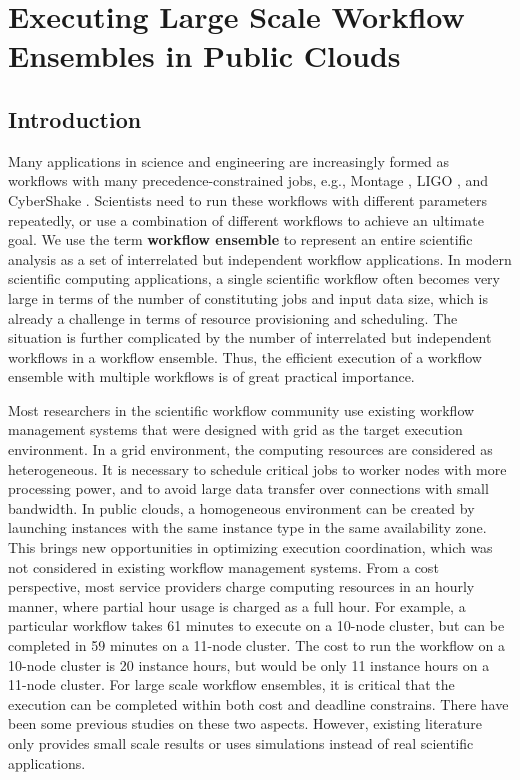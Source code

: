 \chapter{Executing Large Scale Workflow Ensembles in Public Clouds}
\label{chapter:dewe_v2}

\section{Introduction}
\label{sec:intro}

Many applications in science and engineering are increasingly formed as workflows with many precedence-constrained jobs, e.g., Montage \cite{montage, web:montage}, LIGO \cite{ligo}, and CyberShake \cite{cybershake}. Scientists need to run these workflows with different parameters repeatedly, or use a combination of different workflows to achieve an ultimate goal. We use the term \textbf{workflow ensemble} to represent an entire scientific analysis as a set of interrelated but independent workflow applications. In modern scientific computing applications, a single scientific workflow often becomes very large in terms of the number of constituting jobs and input data size, which is already a challenge in terms of resource provisioning and scheduling. The situation is further complicated by the number of interrelated but independent workflows in a workflow ensemble. Thus, the efficient execution of a workflow ensemble with multiple workflows is of great practical importance.

Most researchers in the scientific workflow community use existing workflow management systems that were designed with grid as the target execution environment. In a grid environment, the computing resources are considered as heterogeneous. It is necessary to schedule critical jobs to worker nodes with more processing power, and to avoid large data transfer over connections with small bandwidth. In public clouds, a homogeneous environment can be created by launching instances with the same instance type in the same availability zone. This brings new opportunities in optimizing execution coordination, which was not considered in existing workflow management systems. From a cost perspective, most service providers charge computing resources in an hourly manner, where partial hour usage is charged as a full hour. For example, a particular workflow takes 61 minutes to execute on a 10-node cluster, but can be completed in 59 minutes on a 11-node cluster. The cost to run the workflow on a 10-node cluster is 20 instance hours, but would be only 11 instance hours on a 11-node cluster. For large scale workflow ensembles, it is critical that the execution can be completed within both cost and deadline constrains. There have been some previous studies on these two aspects. However, existing literature only provides small scale results or uses simulations instead of real scientific applications.



